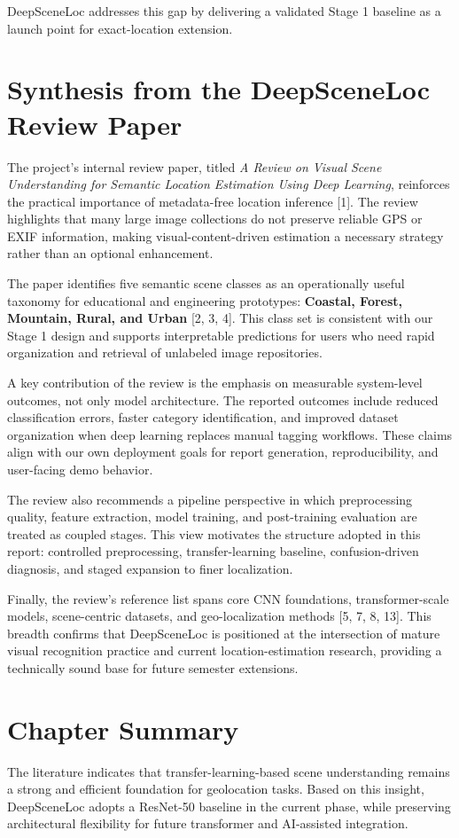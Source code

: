 DeepSceneLoc addresses this gap by delivering a validated Stage 1 baseline as a launch point for exact-location extension.

\section{Synthesis from the DeepSceneLoc Review Paper}
The project's internal review paper, titled \textit{A Review on Visual Scene Understanding for Semantic Location Estimation Using Deep Learning}, reinforces the practical importance of metadata-free location inference [1]. The review highlights that many large image collections do not preserve reliable GPS or EXIF information, making visual-content-driven estimation a necessary strategy rather than an optional enhancement.

The paper identifies five semantic scene classes as an operationally useful taxonomy for educational and engineering prototypes: \textbf{Coastal, Forest, Mountain, Rural, and Urban} [2, 3, 4]. This class set is consistent with our Stage 1 design and supports interpretable predictions for users who need rapid organization and retrieval of unlabeled image repositories.

A key contribution of the review is the emphasis on measurable system-level outcomes, not only model architecture. The reported outcomes include reduced classification errors, faster category identification, and improved dataset organization when deep learning replaces manual tagging workflows. These claims align with our own deployment goals for report generation, reproducibility, and user-facing demo behavior.

The review also recommends a pipeline perspective in which preprocessing quality, feature extraction, model training, and post-training evaluation are treated as coupled stages. This view motivates the structure adopted in this report: controlled preprocessing, transfer-learning baseline, confusion-driven diagnosis, and staged expansion to finer localization.

Finally, the review's reference list spans core CNN foundations, transformer-scale models, scene-centric datasets, and geo-localization methods [5, 7, 8, 13]. This breadth confirms that DeepSceneLoc is positioned at the intersection of mature visual recognition practice and current location-estimation research, providing a technically sound base for future semester extensions.

\section{Chapter Summary}
The literature indicates that transfer-learning-based scene understanding remains a strong and efficient foundation for geolocation tasks. Based on this insight, DeepSceneLoc adopts a ResNet-50 baseline in the current phase, while preserving architectural flexibility for future transformer and AI-assisted integration.

